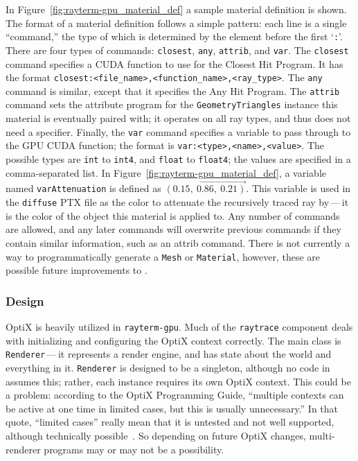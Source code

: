 In Figure~\ref{fig:rayterm-gpu_material_def} a sample material definition is shown.
The format of a material definition follows a simple pattern: each line is a single ``command,'' the type of which is determined by the element before the first `\texttt{:}'.
There are four types of commands: \texttt{closest}, \texttt{any}, \texttt{attrib}, and \texttt{var}.
The \texttt{closest} command specifies a CUDA function to use for the Closest Hit Program.
It has the format \texttt{closest:<file\_name>,<function\_name>,<ray\_type>}.
The \texttt{any} command is similar, except that it specifies the Any Hit Program.
The \texttt{attrib} command sets the attribute program for the \texttt{GeometryTriangles} instance this material is eventually paired with; it operates on all ray types, and thus does not need a specifier.
Finally, the \texttt{var} command specifies a variable to pass through to the GPU CUDA function; the format is \texttt{var:<type>,<name>,<value>}.
The possible types are \texttt{int} to \texttt{int4}, and \texttt{float} to \texttt{float4}; the values are specified in a comma-separated list.
In Figure~\ref{fig:rayterm-gpu_material_def}, a variable named \texttt{varAttenuation} is defined as $\vec{(0.15,\ 0.86,\ 0.21)}$.
This variable is used in the \texttt{diffuse} PTX file as the color to attenuate the recursively traced ray by\,---\,it is the color of the object this material is applied to.
Any number of commands are allowed, and any later commands will overwrite previous commands if they contain similar information, such as an attrib command.
There is not currently a way to programmatically generate a \texttt{Mesh} or \texttt{Material}, however, these are possible future improvements to \name{}.


\subsubsection{Design} \label{ch:methods:renderer:parallel:design}

OptiX is heavily utilized in \texttt{rayterm-gpu}.
Much of the \texttt{raytrace} component deals with initializing and configuring the OptiX context correctly.
The main class is \texttt{Renderer}\,---\,it represents a render engine, and has state about the world and everything in it.
\texttt{Renderer} is designed to be a singleton, although no code in \name{} assumes this; rather, each instance requires its own OptiX context.
This could be a problem: according to the OptiX Programming Guide, ``multiple contexts can be active at one time in limited cases, but this is usually unnecessary.''
In that quote, ``limited cases'' really mean that it is untested and not well supported, although technically possible~\cite{nvidia2019optixdoc}.
So depending on future OptiX changes, multi-renderer programs may or may not be a possibility.

